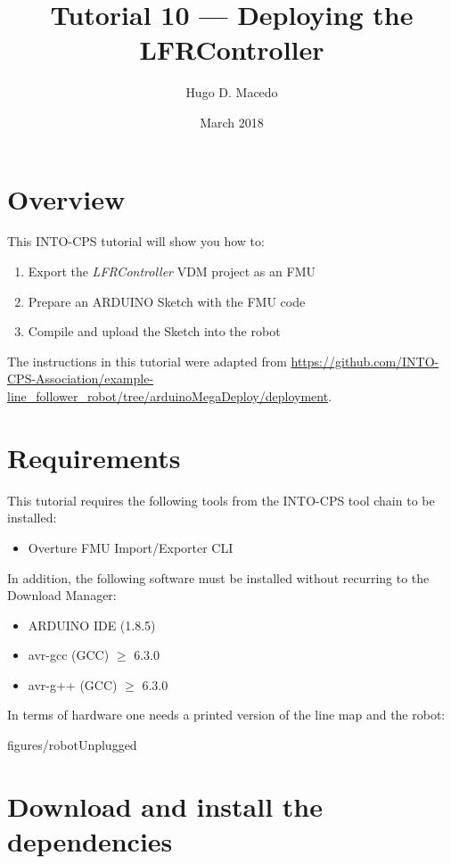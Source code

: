 \documentclass[11pt,a4paper]{../tutorial}
\title{Tutorial 10 --- Deploying the LFRController}
\date{March 2018}
\author{Hugo D. Macedo}
\begin{document}
\section*{Overview}

This INTO-CPS tutorial will show you how to:

\begin{enumerate}[noitemsep]

\item Export the \emph{LFRController} VDM project as an FMU
\item Prepare an ARDUINO Sketch with the FMU code 
\item Compile and upload the Sketch into the robot 
\end{enumerate}

The instructions in this tutorial were adapted from \url{https://github.com/INTO-CPS-Association/example-line\_follower_robot/tree/arduinoMegaDeploy/deployment}. 

\section*{Requirements}

This tutorial requires the following tools from the INTO-CPS tool chain to be installed:

\begin{itemize}[noitemsep]
\item Overture FMU Import/Exporter CLI
\end{itemize}

In addition, the following software must be installed without recurring to the Download Manager: 

\begin{itemize}[noitemsep]
\item ARDUINO IDE (1.8.5) 
\item avr-gcc (GCC) $\geq$ 6.3.0
\item avr-g++ (GCC) $\geq$ 6.3.0   
\end{itemize}

In terms of hardware one needs a printed version of the line map and the robot:

\begin{annotation}[width=0.85\linewidth,trim={20cm 20cm 20cm 20cm},clip]{figures/robotUnplugged}
\end{annotation}

\newpage
\section{Download and install the dependencies}
\end{document}
